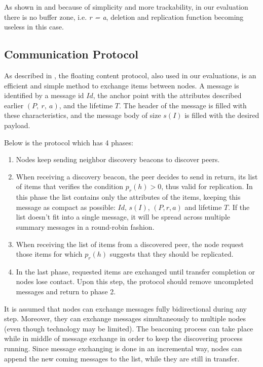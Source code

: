 As shown in \cite{percomfloatingcontent} and because of simplicity and more
trackability, in our evaluation there is no buffer zone, i.e. {\it r = a},
deletion and replication function becoming useless in this case.

\subsection{Communication Protocol}

As described in \cite{percomfloatingcontent}, the floating content protocol,
also used in our evaluations, is an efficient and simple method to exchange
items between nodes. A message is identified by a message id $Id$, the anchor point
with the attributes described earlier $(P,\ r,\ a)$, and the lifetime $T$. The
header of the message is filled with these characteristics, and the message body
of size $s(I)$ is filled with the desired payload.

Below is the protocol which has 4 phases:

\begin{enumerate}[1.]
  \item Nodes keep sending neighbor discovery beacons to discover peers.
  \item When receiving a discovery beacon, the peer decides to send in return,
  its list of items that verifies the condition $p_r(h) > 0$, thus valid for
  replication. In this phase the list contains only the attributes of the items,
  keeping this message as compact as possible: $Id$, $s(I)$, $(P, r, a)$ and
  lifetime $T$. If the list doesn't fit into a single message, it will be spread
  across multiple summary messages in a round-robin fashion.
  \item When receiving the list of items from a discovered peer, the node
  request those items for which $p_r(h)$ suggests that they should be replicated.
  \item In the last phase, requested items are exchanged until transfer
  completion or nodes lose contact. Upon this step, the protocol should remove
  uncompleted messages and return to phase 2.
\end{enumerate}

It is assumed that nodes can exchange messages fully bidirectional during any
step. Moreover, they can exchange messages simultaneously to multiple nodes
(even though technology may be limited). The beaconing process can take place
while in middle of message exchange in order to keep the discovering process
running. Since message exchanging is done in an incremental way, nodes can
append the new coming messages to the list, while they are still in transfer.


